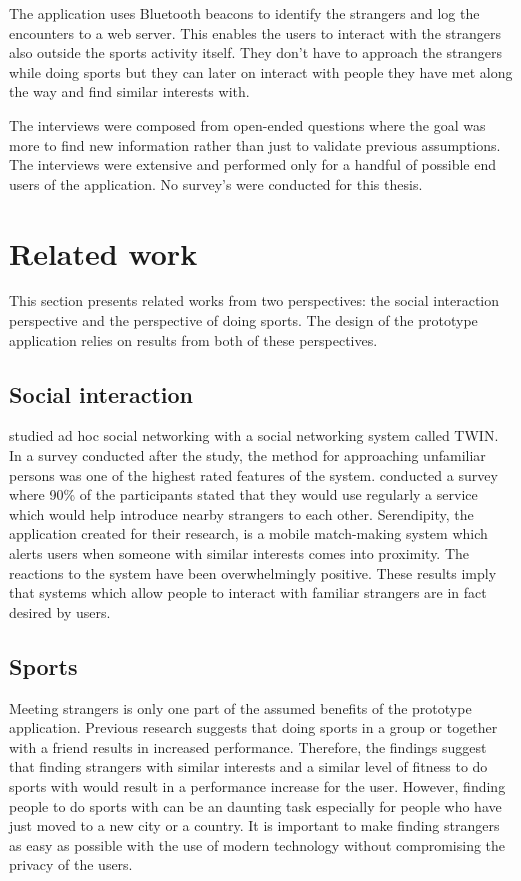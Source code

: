 The application uses Bluetooth beacons to identify the strangers and log the encounters to a web server. This enables the users to interact with the strangers also outside the sports activity itself. They don't have to approach the strangers while doing sports but they can later on interact with people they have met along the way and find similar interests with. 

The interviews were composed from open-ended questions where the goal was more to find new information rather than just to validate previous assumptions. The interviews were extensive and performed only for a handful of possible end users of the application. No survey's were conducted for this thesis.

\section{Related work}


This section presents related works from two perspectives: the social interaction perspective and the perspective of doing sports. The design of the prototype application relies on results from both of these perspectives.

\subsection{Social interaction}

\cite{socialAdHoc} studied ad hoc social networking with a social networking system called TWIN. In a survey conducted after the study, the method for approaching unfamiliar persons was one of the highest rated features of the system. \cite{mobileMatchmaking} conducted a survey where 90\% of the participants stated that they would use regularly a service which would help introduce nearby strangers to each other. Serendipity, the application created for their research, is a mobile match-making system which alerts users when someone with similar interests comes into proximity. The reactions to the system have been overwhelmingly positive. These results imply that systems which allow people to interact with familiar strangers are in fact desired by users.

\subsection{Sports}

Meeting strangers is only one part of the assumed benefits of the prototype application. Previous research suggests that doing sports in a group or together with a friend results in increased performance. Therefore, the findings suggest that finding strangers with similar interests and a similar level of fitness to do sports with would result in a performance increase for the user. However, finding people to do sports with can be an daunting task especially for people who have just moved to a new city or a country. It is important to make finding strangers as easy as possible with the use of modern technology without compromising the privacy of the users.

